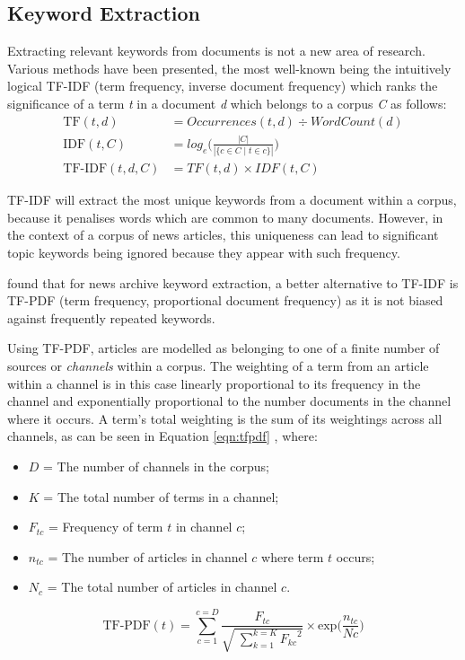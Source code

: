 \subsection{Keyword Extraction}

Extracting relevant keywords from documents is not a new area of research. Various methods have been presented, the most well-known being the intuitively logical TF-IDF (term frequency, inverse document frequency) \citep{TermWeightingApproachesInAutomaticTextRetrieval} which ranks the significance of a term \textit{t} in a document \textit{d} which belongs to a corpus \textit{C} as follows:
\begin{equation}
\begin{aligned}
	\text{TF}(t, d) &= Occurrences(t, d) \div WordCount(d) \\[0.5em]
	\text{IDF}(t, C) &= log_e\bigg(\frac{|C|}{|\{c \in C \mid t \in c\}|}\bigg) \\[0.5em]
	\text{TF-IDF}(t, d, C) &= TF(t, d) \times IDF(t, C)
\end{aligned}
\label{eqn:tfidf}
\end{equation}

TF-IDF will extract the most unique keywords from a document within a corpus, because it penalises words which are common to many documents. However, in the context of a corpus of news articles, this uniqueness can lead to significant topic keywords being ignored because they appear with such frequency. 

\citeauthor{TopicExtractionfromnewsArchiveUsingTFPDFAlgorithm} found that for news archive keyword extraction, a better alternative to TF-IDF is TF-PDF (term frequency, proportional document frequency) as it is not biased against frequently repeated keywords.

Using TF-PDF, articles are modelled as belonging to one of a finite number of sources or \textit{channels} within a corpus. The weighting of a term from an article within a channel is in this case linearly proportional to its frequency in the channel and exponentially proportional to the number documents in the channel where it occurs. A term's total weighting is the sum of its weightings across all channels, as can be seen in Equation \ref{eqn:tfpdf} \citep{TopicExtractionfromnewsArchiveUsingTFPDFAlgorithm}, where:
\begin{itemize}[noitemsep]
	\item $D$ = The number of channels in the corpus;
	\item $K$ = The total number of terms in a channel;
	\item $F_{tc}$ = Frequency of term $t$ in channel $c$;
	\item $n_{tc}$ = The number of articles in channel $c$ where term $t$ occurs;
	\item $N_c$ = The total number of articles in channel $c$.
\end{itemize}
\begin{equation}
	\label{eqn:tfpdf}
	\text{TF-PDF}(t) = \sum_{c=1}^{c=D}\frac{F_{tc}}{\sqrt{\;\sum\limits_{k=1}^{k=K}{F_{kc}}^2}}\times\text{exp}{\bigg(\frac{n_{tc}}{Nc}\bigg)}
\end{equation}

